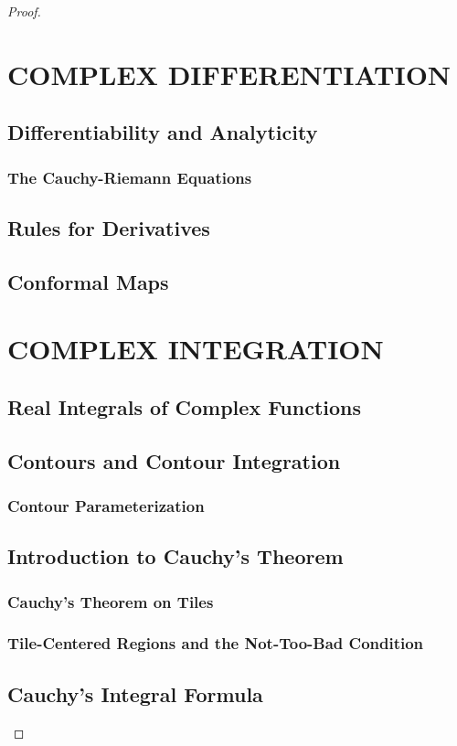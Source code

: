\documentclass{refbook}
\begin{document}
\begin{proof}
\section{COMPLEX DIFFERENTIATION}
\subsection{Differentiability and Analyticity}
\subsubsection{The Cauchy-Riemann Equations}
\subsection{Rules for Derivatives}
\subsection{Conformal Maps}


\section{COMPLEX INTEGRATION}
\subsection{Real Integrals of Complex Functions}
\subsection{Contours and Contour Integration}
\subsubsection{Contour Parameterization}
\subsection{Introduction to Cauchy's Theorem}
\subsubsection{Cauchy's Theorem on Tiles}
\subsubsection{Tile-Centered Regions and the Not-Too-Bad Condition}
\subsection{Cauchy's Integral Formula}

\end{proof}
\end{document}
